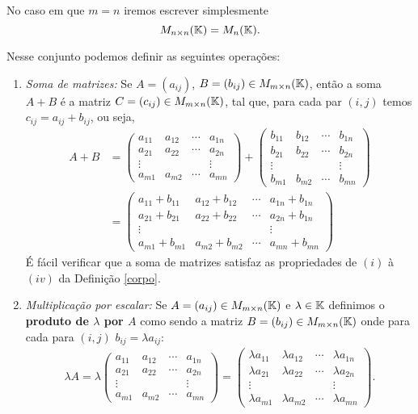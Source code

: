 No caso em que $m = n$ iremos escrever simplesmente
\[
	M_{n\times n}(\mathbb{K}) = M_n(\mathbb{K}).
\]

Nesse conjunto podemos definir as seguintes opera\c{c}\~oes:
\begin{enumerate}
	\item \textit{Soma de matrizes:} Se $A = (a_{ij})$, $B = (b_{ij}) \in M_{m\times n}(\mathbb{K})$, ent\~ao a soma $A + B$ \'e a matriz $C = (c_{ij}) \in M_{m\times n}(\mathbb{K})$, tal que, para cada par $(i,j)$ temos $c_{ij} = a_{ij} + b_{ij}$, ou seja,
	\begin{align*}
		A + B &= \begin{pmatrix}
		a_{11} & a_{12} & \cdots & a_{1n}\\
		a_{21} & a_{22} & \cdots & a_{2n}\\
		\vdots & & & \vdots\\
		a_{m1} & a_{m2} & \cdots & a_{mn}
	\end{pmatrix} + \begin{pmatrix}
		b_{11} & b_{12} & \cdots & b_{1n}\\
		b_{21} & b_{22} & \cdots & b_{2n}\\
		\vdots & & & \vdots\\
		b_{m1} & b_{m2} & \cdots & b_{mn}
	\end{pmatrix}\\ &= \begin{pmatrix}
		a_{11} + b_{11} & a_{12} + b_{12} & \cdots & a_{1n} + b_{1n}\\
		a_{21} + b_{21} & a_{22} + b_{22}& \cdots & a_{2n} + b_{1n}\\
		\vdots & & & \vdots\\
		a_{m1} + b_{m1} & a_{m2} + b_{m2}& \cdots & a_{mn} + b_{mn}
	\end{pmatrix}
	\end{align*}
	\'E f\'acil verificar que a soma de matrizes satisfaz as propriedades de $(i)$ \`a $(iv)$ da Defini\c{c}\~ao \ref{corpo}.

	\item \textit{Multiplica\c{c}\~ao por escalar:} Se $A = (a_{ij}) \in M_{m\times n}(\mathbb{K})$ e $\lambda \in \mathbb{K}$ definimos o \textbf{produto de $\lambda$ por $A$} como sendo a matriz $B = (b_{ij}) \in M_{m\times n}(\mathbb{K})$ onde para cada para $(i,j)$ $b_{ij} = \lambda a_{ij}$:
	\begin{align*}
		\lambda A = \lambda \begin{pmatrix}
		a_{11} & a_{12} & \cdots & a_{1n}\\
		a_{21} & a_{22} & \cdots & a_{2n}\\
		\vdots & & & \vdots\\
		a_{m1} & a_{m2} & \cdots & a_{mn}
	\end{pmatrix} = \begin{pmatrix}
		\lambda a_{11} & \lambda a_{12} & \cdots & \lambda a_{1n}\\
		\lambda a_{21} & \lambda a_{22} & \cdots & \lambda a_{2n}\\
		\vdots & & & \vdots\\
		\lambda a_{m1} & \lambda a_{m2} & \cdots & \lambda a_{mn}
	\end{pmatrix}.
	\end{align*}


\end{enumerate}
